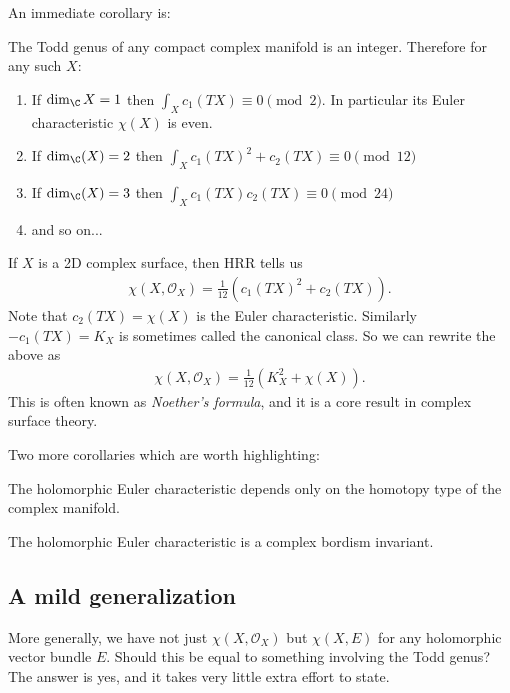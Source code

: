 \documentclass[11pt]{book}
\begin{document}
An immediate corollary is:

\begin{corollary} The Todd genus of any compact complex manifold is an integer. Therefore for any such $X$:
\begin{enumerate}
    \item If $\dim_\C X = 1$ then $\int_X c_1(TX) \equiv 0 \pmod{2}$. In particular its Euler characteristic $\chi(X)$ is even.
    \item If $\dim_\C(X) = 2$ then $\int_X c_1(TX)^2 + c_2(TX) \equiv 0 \pmod{12}$
    \item If $\dim_\C(X) = 3$ then $\int_X c_1(TX)c_2(TX)\equiv 0 \pmod{24}$
    \item and so on...
\end{enumerate}
\end{corollary}

\begin{example} If $X$ is a 2D complex surface, then HRR tells us
\begin{align*}
    \chi(X,\mathcal{O}_X) = \frac{1}{12} \left( c_1(TX)^2 + c_2(TX) \right).
\end{align*}
Note that $c_2(TX) = \chi(X)$ is the Euler characteristic. Similarly $-c_1(TX) = K_X$ is sometimes called the canonical class. So we can rewrite the above as
\begin{align*}
    \chi(X,\mathcal{O}_X) = \frac{1}{12} \left( K_X^2 + \chi(X) \right).
\end{align*}
This is often known as \emph{Noether's formula}, and it is a core result in complex surface theory.
\end{example}

Two more corollaries which are worth highlighting:

\begin{corollary} The holomorphic Euler characteristic depends only on the homotopy type of the complex manifold.
\end{corollary}

\begin{corollary} The holomorphic Euler characteristic is a complex bordism invariant.
\end{corollary}


\subsection{A mild generalization}

More generally, we have not just $\chi(X,\mathcal{O}_X)$ but $\chi(X,E)$ for any holomorphic vector bundle $E$. Should this be equal to something involving the Todd genus? The answer is yes, and it takes very little extra effort to state.
\end{document}
